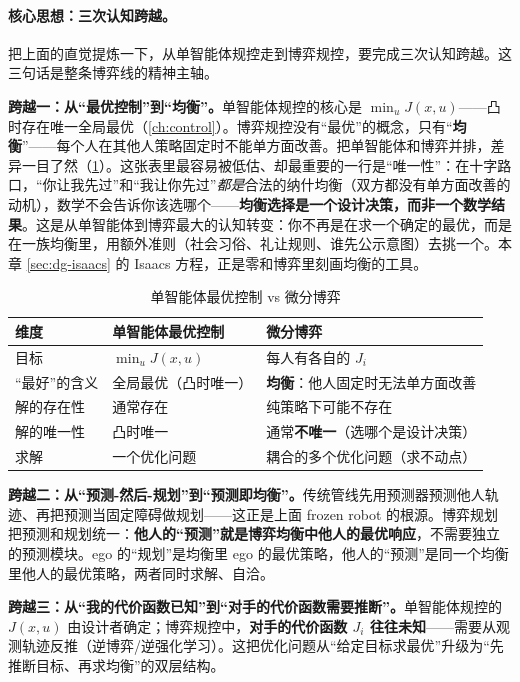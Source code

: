 \paragraph{核心思想：三次认知跨越。}
把上面的直觉提炼一下，从单智能体规控走到博弈规控，要完成三次认知跨越。这三句话是整条博弈线的精神主轴。

\textbf{跨越一：从“最优控制”到“均衡”。}\;单智能体规控的核心是 $\min_u J(x,u)$——凸时存在唯一全局最优（\cref{ch:control}）。博弈规控没有“最优”的概念，只有“\textbf{均衡}”——每个人在其他人策略固定时不能单方面改善。把单智能体和博弈并排，差异一目了然（\cref{tab:dg-vs}）。这张表里最容易被低估、却最重要的一行是“唯一性”：在十字路口，“你让我先过”和“我让你先过”\emph{都是}合法的纳什均衡（双方都没有单方面改善的动机），数学不会告诉你该选哪个——\textbf{均衡选择是一个设计决策，而非一个数学结果}。这是从单智能体到博弈最大的认知转变：你不再是在求一个确定的最优，而是在一族均衡里，用额外准则（社会习俗、礼让规则、谁先公示意图）去挑一个。本章 \cref{sec:dg-isaacs} 的 Isaacs 方程，正是零和博弈里刻画均衡的工具。

\begin{table}[H]\centering\small
\caption{单智能体最优控制 vs 微分博弈}
\label{tab:dg-vs}
\begin{tabular}{p{} p{} p{}}
\toprule
维度 & 单智能体最优控制 & 微分博弈 \\
\midrule
目标 & $\min_u J(x,u)$ & 每人有各自的 $J_i$ \\
“最好”的含义 & 全局最优（凸时唯一） & \textbf{均衡}：他人固定时无法单方面改善 \\
解的存在性 & 通常存在 & 纯策略下可能不存在 \\
解的唯一性 & 凸时唯一 & 通常\textbf{不唯一}（选哪个是设计决策） \\
求解 & 一个优化问题 & 耦合的多个优化问题（求不动点） \\
\bottomrule
\end{tabular}
\end{table}

\textbf{跨越二：从“预测-然后-规划”到“预测即均衡”。}\;传统管线先用预测器预测他人轨迹、再把预测当固定障碍做规划——这正是上面 frozen robot 的根源。博弈规划把预测和规划统一：\textbf{他人的“预测”就是博弈均衡中他人的最优响应}，不需要独立的预测模块。ego 的“规划”是均衡里 ego 的最优策略，他人的“预测”是同一个均衡里他人的最优策略，两者同时求解、自洽。

\textbf{跨越三：从“我的代价函数已知”到“对手的代价函数需要推断”。}\;单智能体规控的 $J(x,u)$ 由设计者确定；博弈规控中，\textbf{对手的代价函数 $J_i$ 往往未知}——需要从观测轨迹反推（逆博弈/逆强化学习）。这把优化问题从“给定目标求最优”升级为“先推断目标、再求均衡”的双层结构。

